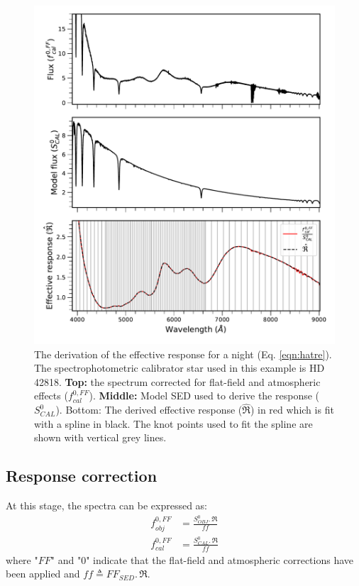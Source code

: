 \begin{figure}[!ht]
\centering
\includegraphics[width=\hsize]{chapters/data_reduction/image/ResponseDerivation.pdf}
     \caption{The derivation of the effective response for a night (Eq. \ref{eqn:hatre}). The spectrophotometric calibrator star used in this example is HD 42818. \textbf{Top:} the spectrum corrected for flat-field and atmospheric effects ($ f_{cal}^{0,FF}$). \textbf{Middle:} Model SED used to derive the response ($S^0_{CAL}$). Bottom: The derived effective response ($\hat{\Re}$) in red which is fit with a spline in black. The knot points used to fit the spline are shown with vertical grey lines. }
     \label{fig:respDerivation}
\end{figure}

\subsection{Response correction}
\label{sec:responsecorr}

At this stage, the spectra can be expressed as:
    \begin{align}
    \label{eq:divff0obj}
    f_{obj}^{0,FF} &= \frac{S^0_{OBJ} .\, \Re}{ff}\\
    \label{eq:divff0cal}
    f_{cal}^{0,FF} &= \frac{S^0_{CAL} .\, \Re}{ff}
    \end{align}
where "$FF$" and "$0$" indicate that the flat-field and atmospheric corrections have been applied and $ff \triangleq FF_{SED} .\, \Re$. 

